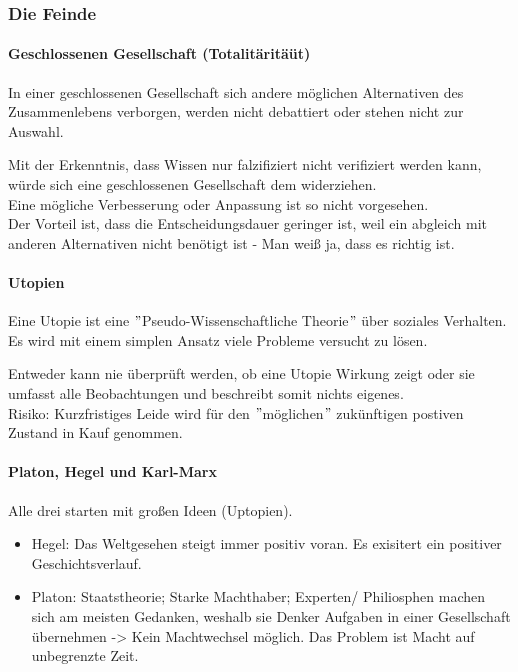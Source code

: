 \subsubsection{Die Feinde}

\paragraph{Geschlossenen Gesellschaft (Totalitäritäüt)}

In einer geschlossenen Gesellschaft sich andere möglichen Alternativen des Zusammenlebens verborgen, werden nicht debattiert oder stehen nicht zur Auswahl.

Mit der Erkenntnis, dass Wissen nur falzifiziert nicht verifiziert werden kann, würde sich eine geschlossenen Gesellschaft dem widerziehen.\\

Eine mögliche Verbesserung oder Anpassung ist so nicht vorgesehen.\\ 

Der Vorteil ist, dass die Entscheidungsdauer geringer ist, weil ein abgleich mit anderen Alternativen nicht benötigt ist - Man weiß ja, dass es richtig ist.

\paragraph{Utopien}
Eine Utopie ist eine $"$Pseudo-Wissenschaftliche Theorie$"$ über soziales Verhalten. Es wird mit einem simplen Ansatz viele Probleme versucht zu lösen.

Entweder kann nie überprüft werden, ob eine Utopie Wirkung zeigt oder sie umfasst alle Beobachtungen und beschreibt somit nichts eigenes.\\

Risiko: Kurzfristiges Leide wird für den $"$möglichen$"$ zukünftigen postiven Zustand in Kauf genommen.

\paragraph{Platon, Hegel und Karl-Marx}
Alle drei starten mit großen Ideen (Uptopien).
\begin{itemize}
	\item Hegel: Das Weltgesehen steigt immer positiv voran. Es exisitert ein positiver Geschichtsverlauf. 
	\item Platon: Staatstheorie; Starke Machthaber; Experten/ Philiosphen machen sich am meisten Gedanken, weshalb sie Denker Aufgaben in einer Gesellschaft übernehmen -> Kein Machtwechsel möglich. Das Problem ist Macht auf unbegrenzte Zeit.
\end{itemize}